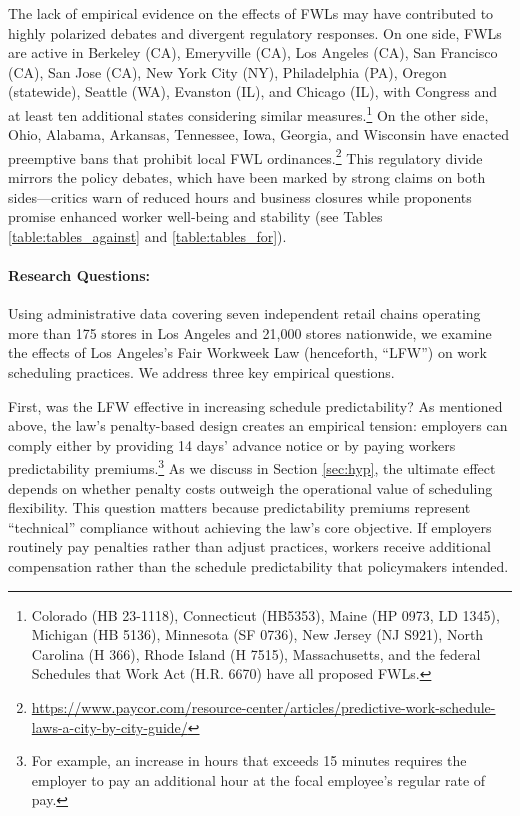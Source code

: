 \documentclass[letterpaper,11pt,leqno]{article}
\theoremstyle{paper}
\begin{document}
The lack of empirical evidence on the effects of FWLs may have contributed to highly polarized debates and divergent regulatory responses. On one side, FWLs are active in Berkeley (CA), Emeryville (CA), Los Angeles (CA), San Francisco (CA), San Jose (CA), New York City (NY), Philadelphia (PA), Oregon (statewide), Seattle (WA), Evanston (IL), and Chicago (IL), with Congress and at least ten additional states considering similar measures.\footnote{Colorado (HB 23-1118), Connecticut (HB5353), Maine (HP 0973, LD 1345), Michigan (HB 5136), Minnesota (SF 0736), New Jersey (NJ S921), North Carolina (H 366), Rhode Island (H 7515), Massachusetts, and the federal Schedules that Work Act (H.R. 6670) have all proposed FWLs.} On the other side, Ohio, Alabama, Arkansas, Tennessee, Iowa, Georgia, and Wisconsin have enacted preemptive bans that prohibit local FWL ordinances.\footnote{\url{https://www.paycor.com/resource-center/articles/predictive-work-schedule-laws-a-city-by-city-guide/}} This regulatory divide mirrors the policy debates, which have been marked by strong claims on both sides—critics warn of reduced hours and business closures while proponents promise enhanced worker well-being and stability (see Tables \ref{table:tables_against} and \ref{table:tables_for}).

\paragraph{Research Questions:}
Using administrative data covering seven independent retail chains operating more than 175 stores in Los Angeles and 21,000 stores nationwide, we examine the effects of Los Angeles's Fair Workweek Law (henceforth, ``LFW'') on work scheduling practices. We address three key empirical questions.  

First, was the LFW effective in increasing schedule predictability? As mentioned above, the law's penalty-based design creates an empirical tension: employers can comply either by providing 14 days' advance notice or by paying workers predictability premiums.\footnote{For example, an increase in hours that exceeds 15 minutes requires the employer to pay an additional hour at the focal employee’s regular rate of pay.} As we discuss in Section \ref{sec:hyp}, the ultimate effect depends on whether penalty costs outweigh the operational value of scheduling flexibility. This question matters because predictability premiums represent ``technical'' compliance without achieving the law's core objective. If employers routinely pay penalties rather than adjust practices, workers receive additional compensation rather than the schedule predictability that policymakers intended.
\end{document}
